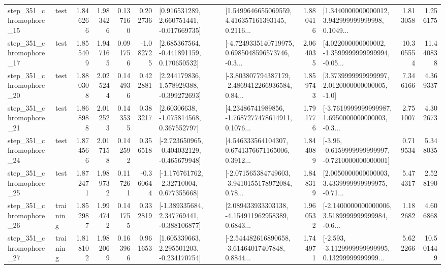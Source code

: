 \begin{tabular}{llrrrrllrlrr}
  step\_351\_chromophore\_15 &      test &      1.846266 &    1.983426 &      0.137160 &  0.202736 &    [0.916531289, 2.660751441, -0.017669735] &  [1.5499646655069559, 4.416357161393145, 0.2116... &       1.880416 &  [1.3440000000000012, 3.942999999999998, 0.1049... &            1.813058 &          1.256175 \\
  step\_351\_chromophore\_17 &      test &      1.855409 &    1.947165 &      0.091756 & -1.082725 &    [2.685367564, -0.441891159, 0.170650532] &  [-4.7249335140719975, 0.6985048596573746, -0.3... &       2.064035 &  [4.022000000000002, -1.3599999999999994, -0.05... &           10.305554 &         11.440838 \\
  step\_351\_chromophore\_20 &      test &      1.880308 &    2.025244 &      0.144936 &  0.422881 &    [2.244179836, 1.578929388, -0.399272693] &  [-3.803807794387179, -2.4869412266936584, 0.84... &       1.859743 &     [3.3739999999999997, 2.0120000000000005, -1.0] &            7.346166 &          4.369337 \\
  step\_351\_chromophore\_21 &      test &      1.868988 &    2.012523 &      0.143535 &  0.383217 &     [2.60306638, -1.075814568, 0.367552797] &  [4.23486741989856, -1.7687277478614911, 0.1076... &       1.791776 &  [-3.7619999999999987, 1.6950000000000003, -0.3... &            2.751007 &          4.302673 \\
  step\_351\_chromophore\_24 &      test &      1.874566 &    2.017158 &      0.142592 &  0.356518 &  [-2.723650965, -0.404032129, -0.465679948] &  [4.546333564104307, 0.6741376671165006, 0.3912... &       1.844089 &  [-3.96, -0.6159999999999997, -0.7210000000000001] &            0.719534 &          5.348035 \\
  step\_351\_chromophore\_25 &      test &      1.872471 &    1.989732 &      0.117261 & -0.360644 &    [-1.176761762, -2.32710004, 0.677355668] &  [-2.071565384749603, -3.9410155178972084, 0.78... &       1.848319 &  [2.0050000000000003, 3.4339999999999975, -0.71... &            5.474317 &          2.528190 \\
  step\_351\_chromophore\_26 &  training &      1.852987 &    1.994742 &      0.141755 &  0.332819 &   [-1.389335684, 2.347769441, -0.388106877] &  [2.089433933303138, -4.154911962958389, 0.6843... &       1.960532 &  [-2.1400000000000006, 3.5189999999999984, -0.6... &            1.182682 &          4.606868 \\
  step\_351\_chromophore\_27 &  training &      1.818102 &    1.982069 &      0.163966 &  0.961653 &    [1.605339663, 2.295501203, -0.234170754] &  [-2.544482616890658, -3.61464017407848, 0.8844... &       1.744971 &  [-2.593, -3.1129999999999995, 0.13299999999999... &            5.622266 &         10.501449 \\

\end{tabular}
